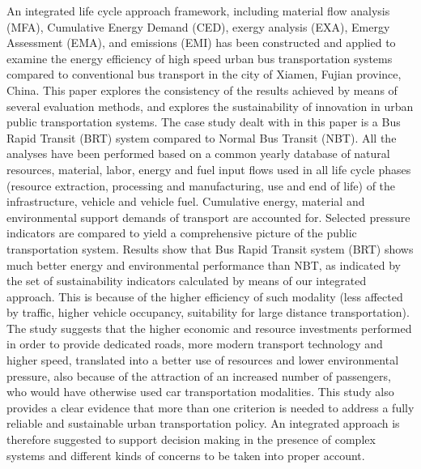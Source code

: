 An integrated life cycle approach framework, including material flow analysis (MFA), Cumulative Energy Demand (CED), exergy analysis (EXA), Emergy Assessment (EMA), and emissions (EMI) has been constructed and applied to examine the energy efficiency of high speed urban bus transportation systems compared to conventional bus transport in the city of Xiamen, Fujian province, China. This paper explores the consistency of the results achieved by means of several evaluation methods, and explores the sustainability of innovation in urban public transportation systems. The case study dealt with in this paper is a Bus Rapid Transit (BRT) system compared to Normal Bus Transit (NBT). All the analyses have been performed based on a common yearly database of natural resources, material, labor, energy and fuel input flows used in all life cycle phases (resource extraction, processing and manufacturing, use and end of life) of the infrastructure, vehicle and vehicle fuel. Cumulative energy, material and environmental support demands of transport are accounted for. Selected pressure indicators are compared to yield a comprehensive picture of the public transportation system. Results show that Bus Rapid Transit system (BRT) shows much better energy and environmental performance than NBT, as indicated by the set of sustainability indicators calculated by means of our integrated approach. This is because of the higher efficiency of such modality (less affected by traffic, higher vehicle occupancy, suitability for large distance transportation). The study suggests that the higher economic and resource investments performed in order to provide dedicated roads, more modern transport technology and higher speed, translated into a better use of resources and lower environmental pressure, also because of the attraction of an increased number of passengers, who would have otherwise used car transportation modalities. This study also provides a clear evidence that more than one criterion is needed to address a fully reliable and sustainable urban transportation policy. An integrated approach is therefore suggested to support decision making in the presence of complex systems and different kinds of concerns to be taken into proper account.